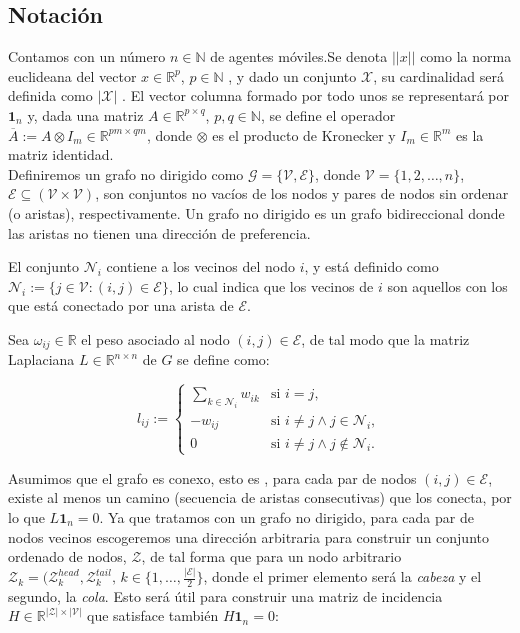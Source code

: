 \documentclass[11pt, a4paper]{article} %
\begin{document}
\subsection{Notación }
Contamos con un número $n \in \mathbb{N}$ de agentes móviles.Se denota $||x||$ como la norma euclideana del vector $x \in \mathbb{R}^p$, $p\in\mathbb{N}$ , y dado un conjunto $\mathcal{X}$, su cardinalidad será definida como $|\mathcal{X}|$ . El vector columna formado por todo unos se representará por $\boldsymbol{1}_n$ y, dada una matriz $A \in \mathbb{R}^{p\times q}$, $p, q\in \mathbb{N}$, se define el operador $\overline{A}:= A\otimes I_m \in \mathbb{R}^{pm\times qm}$, donde $\otimes$ es el producto de Kronecker y $I_m \in \mathbb{R}^m$ es la matriz identidad. \\


Definiremos un grafo no dirigido como \cite{9682800} $\mathcal{G} = \{\mathcal{V},\mathcal{E}\}$, donde $\mathcal{V} = \{1,2,\dots,n\}$, $\mathcal{E} \subseteq (\mathcal{V}\times\mathcal{V})$, son conjuntos no vacíos de los nodos y pares de nodos sin ordenar (o aristas), respectivamente. Un grafo no dirigido es un grafo bidireccional donde las aristas no tienen una dirección de preferencia. 

El conjunto $\mathcal{N}_i$ contiene a los vecinos del nodo $i$, y está definido como $\mathcal{N}_i := \{j \in \mathcal{V}: (i,j)\in\mathcal{E}\}$, lo cual indica que los vecinos de $i$ son aquellos con los que está conectado por una arista de $\mathcal{E}$.

Sea $\omega_{ij}\in \mathbb{R}$ el peso asociado al nodo $(i,j) \in \mathcal{E}$, de tal modo que la matriz Laplaciana $L \in \mathbb{R}^{n\times n}$ de $G$ se define como:

\begin{equation}
l_{ij} :=
\begin{cases} 
\sum_{k \in \mathcal{N}_i} w_{ik} & \text{si } i = j, \\ 
-w_{ij} & \text{si } i \neq j \land j \in \mathcal{N}_i, \\ 
0 & \text{si } i \neq j \land j \notin \mathcal{N}_i.
\end{cases}
\end{equation}

Asumimos que el grafo es conexo, esto es \cite{GTMMN}, para cada par de nodos $(i,j)\in \mathcal{E}$, existe al menos un camino (secuencia de aristas consecutivas) que los conecta, por lo que $L\boldsymbol{1}_n = 0$. Ya que tratamos con un grafo no dirigido, para cada par de nodos vecinos escogeremos una dirección arbitraria para construir un conjunto ordenado de nodos, $\mathcal{Z}$, de tal forma que para un nodo arbitrario $\mathcal{Z}_k = (\mathcal{Z}_k^{head}, \mathcal{Z}_k^{tail},\, k \in \{1,\dots,\frac{|\mathcal{E}|}{2}\}$, donde el primer elemento será la \textit{cabeza} y el segundo, la \textit{cola}. Esto será útil para construir una matriz de incidencia $H\in\mathbb{R}^{|\mathcal{Z}|\times|\mathcal{V}|}$ que satisface también $H\boldsymbol{1}_n =0$:
\end{document}
